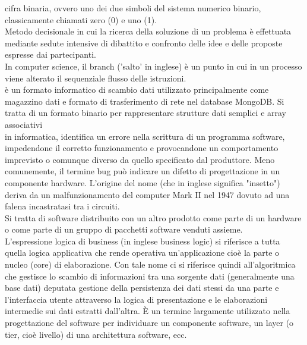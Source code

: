\documentclass{scalatekids-article}
\begin{document}
 cifra binaria, ovvero uno dei due simboli del sistema numerico binario, classicamente chiamati zero (0) e uno (1).
\\

 Metodo decisionale in cui la ricerca della soluzione di un problema è effettuata mediante sedute intensive di dibattito e confronto delle idee e delle proposte espresse dai partecipanti.
\\

 In computer science, il branch ('salto' in inglese) è un punto in cui in un processo viene alterato il sequenziale flusso delle istruzioni.
\\

 è un formato informatico di scambio dati utilizzato principalmente come magazzino dati e formato di trasferimento di rete nel database MongoDB. Si tratta di un formato binario per rappresentare strutture dati semplici e array associativi
\\

 in informatica, identifica un errore nella scrittura di un programma software, impedendone il corretto funzionamento e provocandone un comportamento imprevisto o comunque diverso da quello specificato dal produttore. Meno comunemente, il termine bug può indicare un difetto di progettazione in un componente hardware.
L'origine del nome (che in inglese significa "insetto") deriva da un malfunzionamento del computer Mark II nel 1947 dovuto ad una falena incastratasi tra i circuiti.
\\

 Si tratta di software distribuito con un altro prodotto come parte di un hardware o come parte di un gruppo di pacchetti software venduti assieme.
\\

 L'espressione logica di business (in inglese business logic) si riferisce a tutta quella logica applicativa che rende operativa un'applicazione cioè la parte o nucleo (core) di elaborazione.
Con tale nome ci si riferisce quindi all'algoritmica che gestisce lo scambio di informazioni tra una sorgente dati (generalmente una base dati) deputata gestione della persistenza dei dati stessi da una parte e l'interfaccia utente attraverso la logica di presentazione e le elaborazioni intermedie sui dati estratti dall'altra.
È un termine largamente utilizzato nella progettazione del software per individuare un componente software, un layer (o tier, cioè livello) di una architettura software, ecc.
\\
\end{document}
